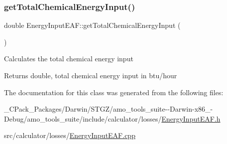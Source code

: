 \subsubsection{\texorpdfstring{get\+Total\+Chemical\+Energy\+Input()}{getTotalChemicalEnergyInput()}\hspace{0.1cm}{\footnotesize\ttfamily [3/3]}}
{\footnotesize\ttfamily double Energy\+Input\+E\+A\+F\+::get\+Total\+Chemical\+Energy\+Input (\begin{DoxyParamCaption}{ }\end{DoxyParamCaption})}

Calculates the total chemical energy input \begin{DoxyReturn}{Returns}
double, total chemical energy input in btu/hour 
\end{DoxyReturn}


The documentation for this class was generated from the following files\+:\begin{DoxyCompactItemize}
\item 
\+\_\+\+C\+Pack\+\_\+\+Packages/\+Darwin/\+S\+T\+G\+Z/amo\+\_\+tools\+\_\+suite-\/-\/\+Darwin-\/x86\+\_-\/\+Debug/amo\+\_\+tools\+\_\+suite/include/calculator/losses/\hyperlink{___c_pack___packages_2_darwin_2_s_t_g_z_2amo__tools__suite--_darwin-x86__64-_debug_2amo__tools__43e9a089c1ddf4438f079e8c0aee2b56}{Energy\+Input\+E\+A\+F.\+h}\item 
src/calculator/losses/\hyperlink{_energy_input_e_a_f_8cpp}{Energy\+Input\+E\+A\+F.\+cpp}\end{DoxyCompactItemize}
